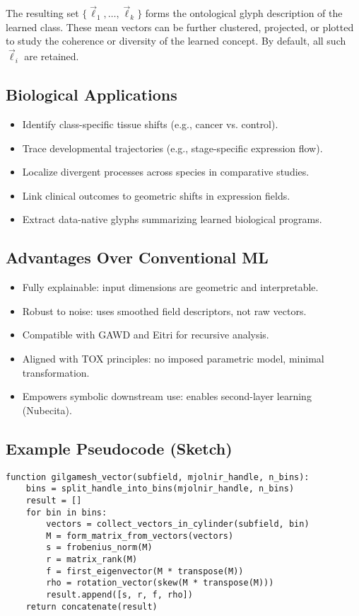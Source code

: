 \documentclass{article}
\begin{document}
The resulting set $\{\vec{\ell}_1, \dots, \vec{\ell}_k\}$ forms the ontological glyph description of the learned class. These mean vectors can be further clustered, projected, or plotted to study the coherence or diversity of the learned concept. By default, all such $\vec{\ell}_i$ are retained.

\subsection{Biological Applications}

\begin{itemize}
  \item Identify class-specific tissue shifts (e.g., cancer vs. control).
  \item Trace developmental trajectories (e.g., stage-specific expression flow).
  \item Localize divergent processes across species in comparative studies.
  \item Link clinical outcomes to geometric shifts in expression fields.
  \item Extract data-native glyphs summarizing learned biological programs.
\end{itemize}

\subsection{Advantages Over Conventional ML}

\begin{itemize}
  \item Fully explainable: input dimensions are geometric and interpretable.
  \item Robust to noise: uses smoothed field descriptors, not raw vectors.
  \item Compatible with GAWD and Eitri for recursive analysis.
  \item Aligned with TOX principles: no imposed parametric model, minimal transformation.
  \item Empowers symbolic downstream use: enables second-layer learning (Nubecita).
\end{itemize}

\subsection{Example Pseudocode (Sketch)}

\begin{verbatim}
function gilgamesh_vector(subfield, mjolnir_handle, n_bins):
    bins = split_handle_into_bins(mjolnir_handle, n_bins)
    result = []
    for bin in bins:
        vectors = collect_vectors_in_cylinder(subfield, bin)
        M = form_matrix_from_vectors(vectors)
        s = frobenius_norm(M)
        r = matrix_rank(M)
        f = first_eigenvector(M * transpose(M))
        rho = rotation_vector(skew(M * transpose(M)))
        result.append([s, r, f, rho])
    return concatenate(result)
\end{verbatim}
\end{document}
